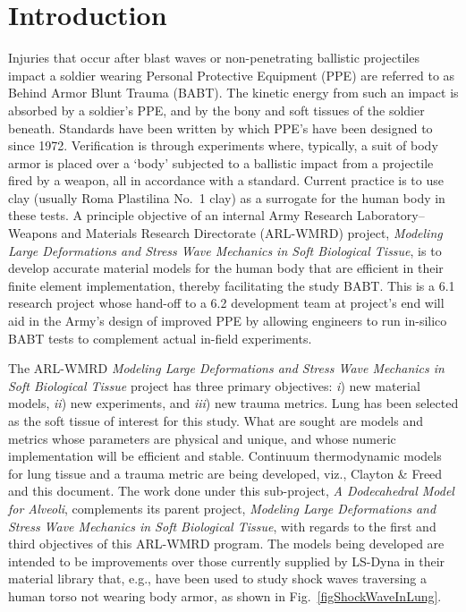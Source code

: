 \part{Introduction}
\label{partIntroduction}

Injuries that occur after blast waves or non-penetrating ballistic projectiles impact a soldier wearing Personal Protective Equipment (PPE) are referred to as Behind Armor Blunt Trauma (BABT).  The kinetic energy from such an impact is absorbed by a soldier's PPE, and by the bony and soft tissues of the soldier beneath.  Standards have been written by which PPE's have been designed to since 1972.  Verification is through experiments where, typically, a suit of body armor is placed over a `body' subjected to a ballistic impact from a projectile fired by a weapon, all in accordance with a standard.  Current practice is to use clay (usually Roma Plastilina No.~1 clay) as a surrogate for the human body in these tests.  A principle objective of an internal Army Research Laboratory--Weapons and Materials Research Directorate (ARL-WMRD) project, \textit{Modeling Large Deformations and Stress Wave Mechanics in Soft Biological Tissue}, is to develop accurate material models for the human body that are efficient in their finite element implementation, thereby facilitating the study BABT.  This is a 6.1 research project whose hand-off to a 6.2 development team at project's end will aid in the Army's design of improved PPE by allowing engineers to run in-silico BABT tests to complement actual in-field experiments.

The ARL-WMRD \textit{Modeling Large Deformations and Stress Wave Mechanics in Soft Biological Tissue\/} project has three primary objectives: \textit{i\/}) new material models, \textit{ii\/}) new experiments, and \textit{iii\/}) new trauma metrics.  Lung has been selected as the soft tissue of interest for this study.  What are sought are models and metrics whose parameters are physical and unique, and whose numeric implementation will be efficient and stable.  Continuum thermo\-dynamic models for lung tissue and a trauma metric are being developed, viz., Clayton \& Freed \cite{ClaytonFreed19,ClaytonFreed20} and this document.  The work done under this sub-project, \textit{A Dodecahedral Model for Alveoli}, complements its parent project, \textit{Modeling Large Deformations and Stress Wave Mechanics in Soft Biological Tissue}, with regards to the first and third objectives of this ARL-WMRD program.  The models being developed are intended to be improvements over those currently supplied by LS-Dyna in their material library that, e.g., have been used to study shock waves traversing a human torso not wearing body armor, as shown in Fig.~\ref{figShockWaveInLung}.

